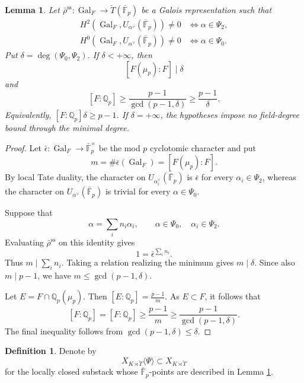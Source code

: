\documentclass[11pt]{amsart}
\newtheorem{lem}[thm]{Lemma}
\theoremstyle{definition}
\newtheorem{defn}[thm]{Definition}
\newcommand{\EDIT}[1]{{\color{purple} #1}}
\newcommand{\Q}{\mathbb{Q}}
\newcommand{\bFp}{\bar{\mathbb{F}}_p}
\newcommand{\bT}{\breve{T}}
\newcommand{\dF}{[F:\Q_p]}
\DeclareMathOperator{\Gal}{Gal}
\begin{document}
\EDIT{
\begin{lem}
Let $\bar\rho^{\mathrm{ss}}:\Gal_F\to\bT(\bFp)$ be a Galois
representation such that
\begin{align*}
H^2(\Gal_F,U_{\alpha^\vee}(\bFp))\neq 0
&\Longleftrightarrow \alpha\in\Psi_2,\\
H^0(\Gal_F,U_{\alpha^\vee}(\bFp))\neq 0
&\Longleftrightarrow \alpha\in\Psi_0.
\end{align*}
Put $\delta=\deg(\Psi_0,\Psi_2)$. If $\delta<+\infty$, then
\[
[F(\mu_p):F]\mid\delta
\]
and
\[
\dF
\geq
\frac{p-1}{\gcd(p-1,\delta)}
\geq
\frac{p-1}{\delta}.
\]
Equivalently, $\dF\delta\geq p-1$. If $\delta=+\infty$, the hypotheses
impose no field-degree bound through the minimal degree.
\label{lem:min-deg}
\end{lem}

\begin{proof}
Let $\bar\epsilon:\Gal_F\to\bFp^\times$ be the mod $p$ cyclotomic
character and put
\[
m=\#\bar\epsilon(\Gal_F)=[F(\mu_p):F].
\]
By local Tate duality, the character on $U_{\alpha_i^\vee}(\bFp)$ is
$\bar\epsilon$ for every $\alpha_i\in\Psi_2$, whereas the character on
$U_{\alpha^\vee}(\bFp)$ is trivial for every $\alpha\in\Psi_0$.

Suppose that
\[
\alpha=\sum_i n_i\alpha_i,
\qquad
\alpha\in\Psi_0,
\quad
\alpha_i\in\Psi_2.
\]
Evaluating $\bar\rho^{\mathrm{ss}}$ on this identity gives
\[
1=\bar\epsilon^{\sum_i n_i}.
\]
Thus $m\mid\sum_i n_i$. Taking a relation realizing the minimum gives
$m\mid\delta$. Since also $m\mid p-1$, we have
$m\leq\gcd(p-1,\delta)$.

Let $E=F\cap\mathbb Q_p(\mu_p)$. Then
$[E:\mathbb Q_p]=\frac{p-1}{m}.$
As $E\subset F$, it follows that
\[
\dF=[F:\mathbb Q_p]
\geq\frac{p-1}{m}
\geq\frac{p-1}{\gcd(p-1,\delta)}.
\]
The final inequality follows from $\gcd(p-1,\delta)\leq\delta$.
\end{proof}
}




\begin{defn}
Denote by
\[
X_{K\rtimes \bT}\langle\Psi\rangle
\subset
X_{K\rtimes \bT}
\]
for the locally closed substack
whose $\bFp$-points
are described in Lemma \ref{lem:min-deg}.
\end{defn}
\end{document}
